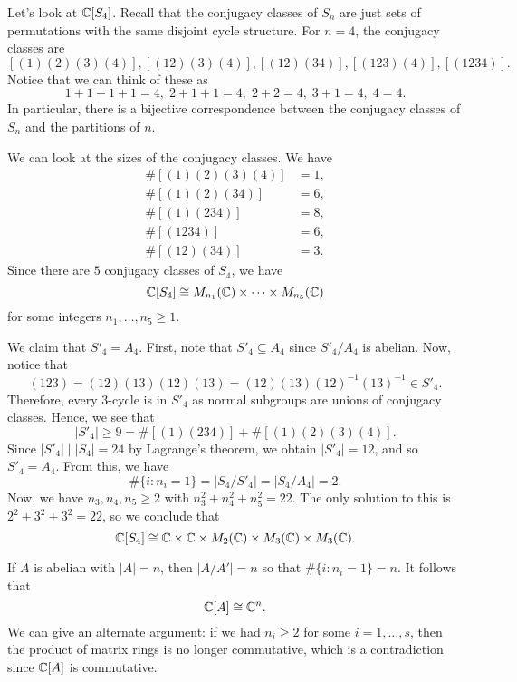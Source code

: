 \begin{exmp}{}
    Let's look at $\mathbb{C}[S_4]$. Recall that the conjugacy classes of $S_n$ 
    are just sets of permutations with the same disjoint cycle structure. 
    For $n = 4$, the conjugacy classes are 
    \[ [(1)(2)(3)(4)], [(12)(3)(4)], [(12)(34)], [(123)(4)], [(1234)]. \] 
    Notice that we can think of these as
    \[ 1+1+1+1=4,\; 2+1+1=4,\; 2+2=4,\; 3+1=4,\; 4=4. \] 
    In particular, there is a bijective correspondence between the conjugacy 
    classes of $S_n$ and the partitions of $n$. 

    We can look at the sizes of the conjugacy classes. We have 
    \begin{align*} 
        \#[(1)(2)(3)(4)] &= 1, \\ 
        \#[(1)(2)(34)] &= 6, \\
        \#[(1)(234)] &= 8, \\
        \#[(1234)] &= 6, \\
        \#[(12)(34)] &= 3. 
    \end{align*}
    Since there are $5$ conjugacy classes of $S_4$, we have 
    \[ \mathbb{C}[S_4] \cong M_{n_1}(\mathbb{C}) \times \cdots \times M_{n_5}(\mathbb{C}) \] 
    for some integers $n_1, \dots, n_5 \geq 1$. 

    We claim that $S'_4 = A_4$. First, note that $S'_4 \subseteq A_4$ 
    since $S'_4/A_4$ is abelian. Now, notice that 
    \[ (123) = (12)(13)(12)(13) = (12)(13)(12)^{-1}(13)^{-1} \in S'_4. \] 
    Therefore, every $3$-cycle is in $S'_4$ as normal subgroups 
    are unions of conjugacy classes. Hence, we see that 
    \[ |S'_4| \geq 9 = \#[(1)(234)] + \#[(1)(2)(3)(4)]. \] 
    Since $|S'_4| \mid |S_4| = 24$ by Lagrange's theorem, we obtain 
    $|S'_4| = 12$, and so $S'_4 = A_4$. From this, we have  
    \[ \#\{i : n_i = 1\} = |S_4/S'_4| = |S_4/A_4| = 2. \] 
    Now, we have $n_3, n_4, n_5 \geq 2$ with $n_3^2 + n_4^2 + n_5^2 = 22$. 
    The only solution to this is $2^2 + 3^2 + 3^2 = 22$, so we conclude that 
    \[ \mathbb{C}[S_4] \cong \mathbb{C} \times \mathbb{C} \times M_2(\mathbb{C}) \times M_3(\mathbb{C}) \times M_3(\mathbb{C}). \] 
\end{exmp}

\begin{exmp}{}
    If $A$ is abelian with $|A| = n$, then $|A/A'| = n$ so that 
    $\#\{i : n_i = 1\} = n$. It follows that 
    \[ \mathbb{C}[A] \cong \mathbb{C}^n. \] 
    We can give an alternate argument: if we had $n_i \geq 2$ for some 
    $i = 1, \dots, s$, then the product of matrix rings is no longer 
    commutative, which is a contradiction since $\mathbb{C}[A]$ is commutative. 
\end{exmp}

